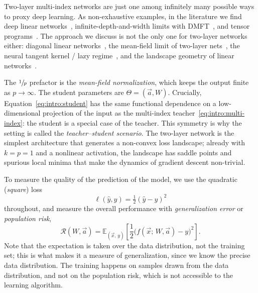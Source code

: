\begin{sloppypar}
Two-layer multi-index networks are just one among infinitely many possible ways to proxy deep learning. As non-exhaustive examples, in the literature we find deep linear networks~\cite{saxe2014exact, arora2018optimization}, infinite-depth-and-width limits with DMFT~\cite{bordelon2024depthwise}, and tensor programs~\cite{yang2019tensor}. The approach we discuss is not the only one for two-layer networks either: diagonal linear networks~\cite{pesme2021implicit,even2023sgd}, the mean-field limit of two-layer nets~\cite{mei2018mean,chizat2018global,rotskoff2022trainability,sirignano2020mean}, the neural tangent kernel / lazy regime~\cite{jacot2018neural}, and the landscape geometry of linear networks~\cite{trager2020pure}.
\end{sloppypar}

The $\sfrac1p$ prefactor is the \emph{mean-field normalization}, which keeps the output
finite as $p \to \infty$.
The student parameters are $\Theta = (\vec{a}, W)$.
Crucially, Equation~\eqref{eq:intro:student} has the same functional dependence on a low-dimensional projection of the input as the
multi-index teacher~\eqref{eq:intro:multi-index}: the student is a special case of
the teacher.
This symmetry is why the setting is called the \emph{teacher--student scenario}.
The two-layer network is the simplest architecture that generates a non-convex
loss landscape; already with $k = p = 1$ and a nonlinear activation, the landscape
has saddle points and spurious local minima that make the dynamics of gradient
descent non-trivial.

To measure the quality of the prediction of the model, we use the quadratic (\emph{square}) loss \[\ell(\hat{y}, y) = \tfrac{1}{2}(\hat{y} - y)^2\]
throughout, and measure the overall performance with \emph{generalization error} or
\emph{population risk},
\begin{equation}
\label{eq:intro:risk}
    \mathcal{R}(W, \vec{a})
    = \mathbb{E}_{(\vec{x},\, y)}\!\left[\frac{1}{2}
        \bigl(f(\vec{x};\, W, \vec{a}) - y\bigr)^2\right].
\end{equation}
Note that the expectation is taken over the data distribution, not the training set; this is what makes it a measure of generalization, since we know the precise data distribution.
The training happens on samples drawn from the data distribution, and not on the population risk, which is not accessible to the learning algorithm.

